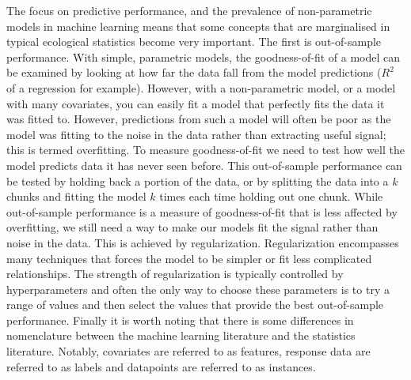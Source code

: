 \documentclass[12pt,]{article}
\begin{document}
The focus on predictive performance, and the prevalence of non-parametric models in machine learning means that some concepts that are marginalised in typical ecological statistics become very important.
The first is out-of-sample performance.
With simple, parametric models, the goodness-of-fit of a model can be examined by looking at how far the data fall from the model predictions ($R^2$ of a regression for example).
However, with a non-parametric model, or a model with many covariates, you can easily fit a model that perfectly fits the data it was fitted to.
However, predictions from such a model will often be poor as the model was fitting to the noise in the data rather than extracting useful signal; this is termed overfitting.
To measure goodness-of-fit we need to test how well the model predicts data it has never seen before.
This out-of-sample performance can be tested by holding back a portion of the data, or by splitting the data into a $k$ chunks and fitting the model $k$ times each time holding out one chunk.
While out-of-sample performance is a measure of goodness-of-fit that is less affected by overfitting, we still need a way to make our models fit the signal rather than noise in the data.
This is achieved by regularization.
Regularization encompasses many techniques that forces the model to be simpler or fit less complicated relationships.
The strength of regularization is typically controlled by hyperparameters and often the only way to choose these parameters is to try a range of values and then select the values that provide the best out-of-sample performance.
Finally it is worth noting that there is some differences in nomenclature between the machine learning literature and the statistics literature.
Notably, covariates are referred to as features, response data are referred to as labels and datapoints are referred to as instances.
\end{document}
